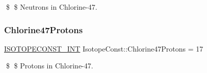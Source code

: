 \$ \$ Neutrons in Chlorine-\/47. \mbox{\label{group___isotope_const-_chlorine-_cl47_ga5289625520db12668aa0304a3d741c0e}} 
\subsubsection{\texorpdfstring{Chlorine47\+Protons}{Chlorine47Protons}}
{\footnotesize\ttfamily \mbox{\hyperlink{group___isotope_const-_macros_ga5f18360b3e99483a35c32d789e62621c}{I\+S\+O\+T\+O\+P\+E\+C\+O\+N\+S\+T\+\_\+\+I\+NT}} Isotope\+Const\+::\+Chlorine47\+Protons = 17}

\$ \$ Protons in Chlorine-\/47. 